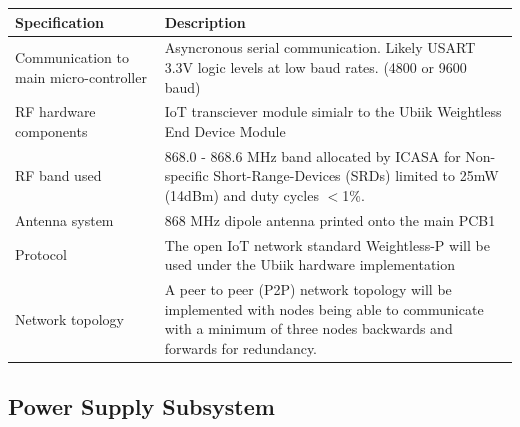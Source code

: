 \documentclass[12pt]{article}
\begin{document}
\begin{center}
  \begin{table}[!htb]
    
    \hskip-2.2cm\begin{tabular}{|p{8cm}|p{10cm}|}
        \hline
        \textbf{Specification} & \textbf{Description} \\
        \hline
        Communication to main micro-controller & Asyncronous serial communication. Likely USART 3.3V logic levels at low
        baud rates. (4800 or 9600 baud) \\[0.3cm]
        
        RF hardware components & IoT transciever module simialr to the Ubiik Weightless End Device Module \\[0.3cm]
        RF band used & 868.0 - 868.6 MHz band allocated by ICASA for Non-specific Short-Range-Devices (SRDs) limited to 
        25mW (14dBm) and duty cycles $<$1\%. \\[0.3cm]
        Antenna system & 868 MHz dipole antenna printed onto the main PCB1 \\[0.3cm]
        Protocol & The open IoT network standard Weightless-P will be used under the Ubiik hardware
        implementation \\[0.3cm]
        Network topology & A peer to peer (P2P) network topology will be implemented with nodes being able to communicate
        with a minimum of three nodes backwards and forwards for redundancy.\\[0.3cm]

        \hline

    \end{tabular}    
    
    \label{tab:summary_measurments}
   \end{table}
\end{center}


\subsection{Power Supply Subsystem}
\end{document}

